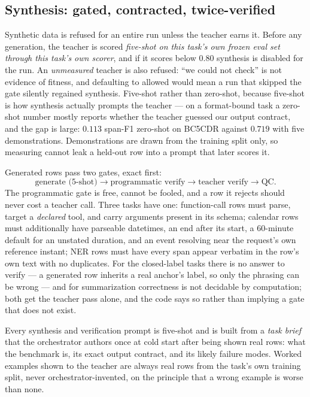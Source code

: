 \documentclass[sigconf,10pt]{acmart}
\begin{document}
\subsection{Synthesis: gated, contracted, twice-verified}
\label{sec:system-synthesis}

Synthetic data is refused for an entire run unless the teacher earns it. Before any
generation, the teacher is scored \emph{five-shot on this task's own frozen eval set through
this task's own scorer}, and if it scores below $0.80$ synthesis is disabled for the run. An
\emph{unmeasured} teacher is also refused: ``we could not check'' is not evidence of fitness,
and defaulting to allowed would mean a run that skipped the gate silently regained synthesis.
Five-shot rather than zero-shot, because five-shot is how synthesis actually prompts the
teacher --- on a format-bound task a zero-shot number mostly reports whether the teacher
guessed our output contract, and the gap is large: $0.113$ span-F1 zero-shot on BC5CDR
against $0.719$ with five demonstrations. Demonstrations are drawn from the training split
only, so measuring cannot leak a held-out row into a prompt that later scores it.

Generated rows pass two gates, exact first:
\[
\text{generate (5-shot)} \to \text{programmatic verify} \to \text{teacher verify} \to \text{QC}.
\]
The programmatic gate is free, cannot be fooled, and a row it rejects should never cost a
teacher call. Three tasks have one: function-call rows must parse, target a \emph{declared}
tool, and carry arguments present in its schema; calendar rows must additionally have parseable
datetimes, an end after its start, a 60-minute default for an unstated duration, and an event
resolving near the request's own reference instant; NER rows must have every span appear
verbatim in the row's own text with no duplicates. For the closed-label tasks there is no
answer to verify --- a generated row inherits a real anchor's label, so only the phrasing can
be wrong --- and for summarization correctness is not decidable by computation; both get the
teacher pass alone, and the code says so rather than implying a gate that does not exist.

Every synthesis and verification prompt is five-shot and is built from a \emph{task brief}
that the orchestrator authors once at cold start after being shown real rows: what the
benchmark is, its exact output contract, and its likely failure modes. Worked examples shown
to the teacher are always real rows from the task's own training split, never
orchestrator-invented, on the principle that a wrong example is worse than none.
\end{document}
